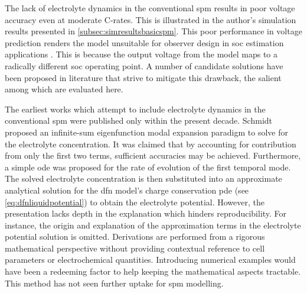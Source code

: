 

The lack of electrolyte dynamics in the conventional \gls{spm} results in poor 
voltage accuracy  even at  moderate {C-rates}.  This is illustrated in the
author's simulation results presented in \cref{subsec:simresultsbasicspm}. This
poor performance in voltage prediction renders  the model unsuitable for 
observer design in  \gls{soc} estimation applications . This is because the
output voltage from the model maps  to a radically different \gls{soc} operating
point. A  number of candidate  solutions have  been proposed in  literature that
strive to mitigate  this drawback,  the salient among which are evaluated here.

The  earliest   works  which  attempt  to   include  electrolyte  dynamics
in  the  conventional  \gls{spm}  were   published  only  within  the  present
decade. Schmidt~\etal~\cite{Schmidt2010c} proposed an infinite-sum eigenfunction
modal  expansion  paradigm  to  solve  for  the  electrolyte  concentration.  It
was  claimed  that by  accounting  for  contribution  from  only the  first  two
terms, sufficient  accuracies may be  achieved. Furthermore, a  simple \gls{ode}
was  proposed  for  the rate  of  evolution  of  the  first temporal  mode.  The
solved  electrolyte  concentration  is  then  substituted  into  an  approximate
analytical solution for the \gls{dfn} model's charge conservation \gls{pde} (see
\cref{eq:dfnliquidpotential}) to obtain the  electrolyte potential. However, the
presentation lacks depth  in the explanation which  hinders reproducibility. For
instance,  the  origin  and  explanation  of  the  approximation  terms  in  the
electrolyte  potential solution  is omitted.  Derivations are  performed from  a
rigorous mathematical perspective without providing contextual reference to cell
parameters or  electrochemical quantities. Introducing numerical  examples would
have been a redeeming factor to help keeping the mathematical aspects tractable.
This method has not seen further uptake for \gls{spm} modelling.

